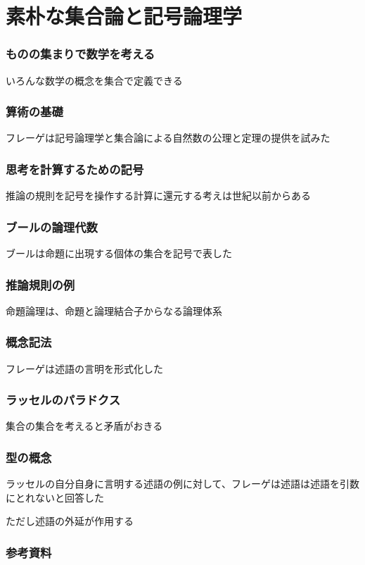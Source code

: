 \documentclass[unicode, 14pt, aspectratio=169]{beamer}
\begin{document}
\section{素朴な集合論と記号論理学}
\begin{frame}
  \frametitle{ものの集まりで数学を考える}
  {\large いろんな数学の概念を集合で定義できる}
\end{frame}
\begin{frame}
  \frametitle{算術の基礎}
  {\large フレーゲは記号論理学と集合論による自然数の公理と定理の提供を試みた}
\end{frame}
\begin{frame}
  \frametitle{思考を計算するための記号}
  {\large 推論の規則を記号を操作する計算に還元する考えは世紀以前からある}
\end{frame}
\begin{frame}
  \frametitle{ブールの論理代数}
  {\large ブールは命題に出現する個体の集合を記号で表した}
\end{frame}
\begin{frame}
  \frametitle{推論規則の例}
  {\large 命題論理は、命題と論理結合子からなる論理体系}
\end{frame}
\begin{frame}
  \frametitle{概念記法}
  {\large フレーゲは述語の言明を形式化した}
\end{frame}
\begin{frame}
  \frametitle{ラッセルのパラドクス}
  {\large 集合の集合を考えると矛盾がおきる}
\end{frame}
\begin{frame}
  \frametitle{型の概念}
  ラッセルの自分自身に言明する述語の例に対して、フレーゲは述語は述語を引数にとれないと回答した

  ただし述語の外延が作用する
\end{frame}
\begin{frame}[allowframebreaks,t]
  \frametitle{参考資料}  
  \printbibliography
\end{frame}
\end{document}
